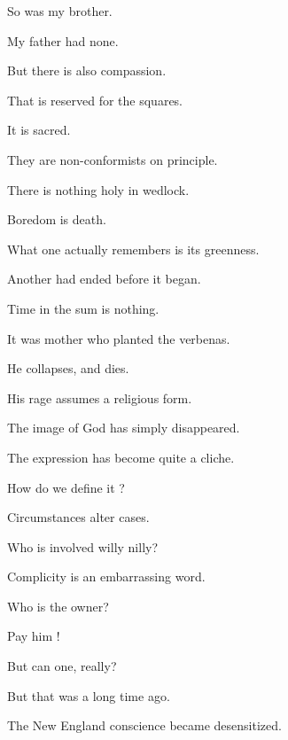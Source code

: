 \documentclass[11pt]{article}
\begin{document}
So was my brother. 

My father had none. 

But there is also compassion. 

That is reserved for the squares. 

It is sacred. 

They are non-conformists on principle. 

There is nothing holy in wedlock. 

Boredom is death. 

What one actually remembers is its greenness. 

Another had ended before it began. 

Time in the sum is nothing. 

It was mother who planted the verbenas. 

He collapses, and dies. 

His rage assumes a religious form.

The image of God has simply disappeared. 

The expression has become quite a cliche.

How do we define it ?

Circumstances alter cases. 

Who is involved willy nilly?

Complicity is an embarrassing word. 

Who is the owner?

Pay him !

But can one, really?

But that was a long time ago.

The New England conscience became desensitized.
\end{document}
